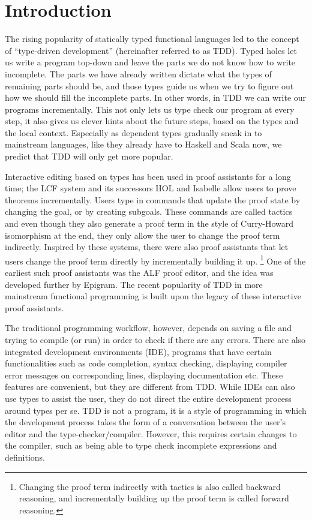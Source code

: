 \section{Introduction} \label{sec:introduction}

The rising popularity of statically typed functional languages led to
the concept of ``type-driven development'' (hereinafter referred to as TDD).
Typed holes let us write a program top-down and leave the parts we do not know
how to write incomplete. The parts we have already written dictate what the
types of remaining parts should be, and those types guide us when we try to
figure out how we should fill the incomplete parts.
In other words, in TDD we can write our programs incrementally. This not only
lets us type check our program at every step, it also gives us clever
hints about the future steps, based on the types and the local context.
Especially as dependent types gradually sneak in to mainstream languages, like
they already have to Haskell\cite{eisenberg} and Scala\cite{scalaDep} now, we
predict that TDD will only get more popular.

Interactive editing based on types has been used in proof assistants for a long
time; the LCF system\cite{lcf} and its successors HOL and
Isabelle\cite{isabelle} allow users to prove theorems
incrementally. Users type in commands that update the proof state by
changing the goal, or by creating subgoals. These commands are called
tactics and even though they also generate a proof term in the style
of Curry-Howard isomorphism at the end, they only allow the user to change the
proof term indirectly.
Inspired by these systems, there were also proof assistants that let users
change the proof term directly by incrementally building it up.
\footnote{Changing the proof term indirectly with tactics is also called
backward reasoning, and incrementally building up the proof term is called
forward reasoning.} One of the earliest such proof assistants was the ALF proof
editor\cite{ALF}, and the idea was developed further by Epigram.\cite{epigram}
The recent popularity of TDD in more mainstream functional programming is built
upon the legacy of these interactive proof assistants.

The traditional programming workflow, however, depends on saving a
file and trying to compile (or run) in order to check if there are any
errors. There are also integrated development environments (IDE),
programs that have certain functionalities such as code completion, syntax
checking, displaying compiler error messages on corresponding lines, displaying
documentation etc. These features are convenient, but they are different from
TDD. While IDEs can also use types to assist the user, they do not direct the
entire development process around types per se. TDD is not a program, it is a
style of programming in which the development process takes the form of a
conversation between the user's editor and the type-checker/compiler. However,
this requires certain changes to the compiler, such as being able to type check
incomplete expressions and definitions.\cite{tdd}

